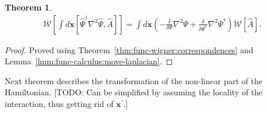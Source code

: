 \documentclass[12pt,aip,jmp,amssymb,amsmath]{revtex4-1}
\newtheorem{theorem}{Theorem}
\begin{document}
\begin{theorem}
\label{thm:transformations:w-laplacian-commutator1}
    \begin{equation*}\begin{split}
        \mathcal{W} \left[
            \int d\boldsymbol{x} [\hat{\Psi}^\dagger \nabla^2 \hat{\Psi}, \hat{A}]
        \right]
        = \int d\boldsymbol{x} \left(
            - \frac{\delta}{\delta \Psi} \nabla^2 \Psi
            + \frac{\delta}{\delta \Psi^*} \nabla^2 \Psi^*
        \right) \mathcal{W}[\hat{A}].
    \end{split}\end{equation*}
\end{theorem}
\begin{proof}
Proved using Theorem~\ref{thm:func-wigner:correspondences} and Lemma~\ref{lmm:func-calculus:move-laplacian}.
\end{proof}

Next theorem describes the transformation of the non-linear part of the Hamiltonian.
[TODO: Can be simplified by assuming the locality of the interaction, thus getting rid of $\boldsymbol{x}^\prime$.]
\end{document}
